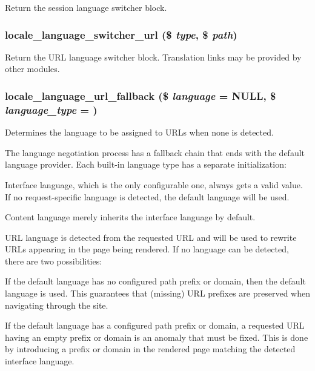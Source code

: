 Return the session language switcher block. \hypertarget{group__locale_ga73c68f3cdad0f635f29bdd5268d81af5}{
\subsubsection[{locale\_\-language\_\-switcher\_\-url}]{\setlength{\rightskip}{0pt plus 5cm}locale\_\-language\_\-switcher\_\-url (\$ {\em type}, \/  \$ {\em path})}}
\label{group__locale_ga73c68f3cdad0f635f29bdd5268d81af5}
Return the URL language switcher block. Translation links may be provided by other modules. \hypertarget{group__locale_ga0fe34148ed5e348c43882bcb3f9e418c}{
\subsubsection[{locale\_\-language\_\-url\_\-fallback}]{\setlength{\rightskip}{0pt plus 5cm}locale\_\-language\_\-url\_\-fallback (\$ {\em language} = {\ttfamily NULL}, \/  \$ {\em language\_\-type} = {})}}
\label{group__locale_ga0fe34148ed5e348c43882bcb3f9e418c}
Determines the language to be assigned to URLs when none is detected.

The language negotiation process has a fallback chain that ends with the default language provider. Each built-\/in language type has a separate initialization:
\begin{DoxyItemize}
\item Interface language, which is the only configurable one, always gets a valid value. If no request-\/specific language is detected, the default language will be used.
\item Content language merely inherits the interface language by default.
\item URL language is detected from the requested URL and will be used to rewrite URLs appearing in the page being rendered. If no language can be detected, there are two possibilities:
\begin{DoxyItemize}
\item If the default language has no configured path prefix or domain, then the default language is used. This guarantees that (missing) URL prefixes are preserved when navigating through the site.
\item If the default language has a configured path prefix or domain, a requested URL having an empty prefix or domain is an anomaly that must be fixed. This is done by introducing a prefix or domain in the rendered page matching the detected interface language.
\end{DoxyItemize}
\end{DoxyItemize}


